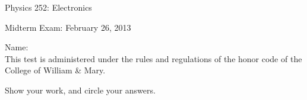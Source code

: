 \documentclass[letterpaper,addpoints,answers]{exam}
\begin{document}

\begin{coverpages}
 \large\bfseries
 
 \noindent 
 Physics 252: Electronics
 
 \vspace{2ex}
 \noindent
 Midterm Exam: February 26, 2013

 \vspace{5ex}
 \noindent 
 Name:\enspace\makebox[2in]{\hrulefill}\\

 \vspace{5ex}
 \noindent 
 This test is administered under the rules and regulations of the honor 
 code of the College of William \& Mary.  

 \vspace{5ex}
 \noindent 
 Show your work, and circle your answers.

 \vspace{5ex}
 \begin{center}
  \gradetable[v][questions]
 \end{center}
\end{coverpages}
 
\end{document}
